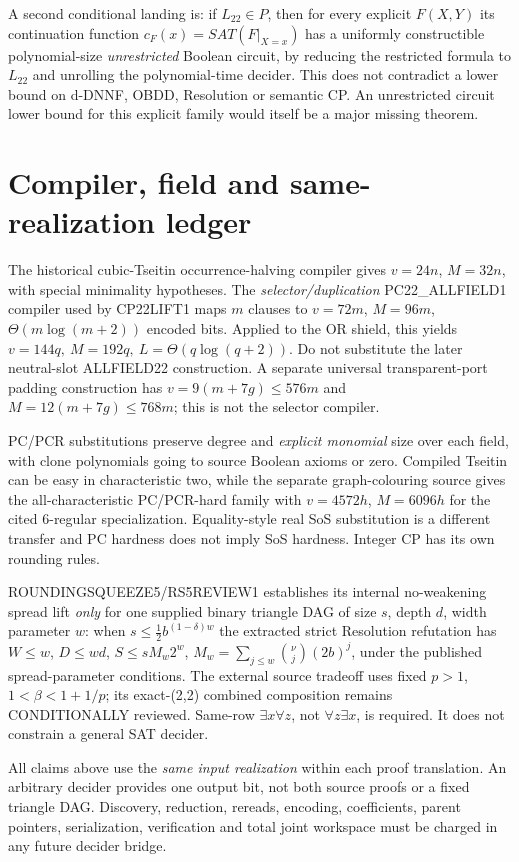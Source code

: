 \documentclass[11pt]{article}
\begin{document}
A second conditional landing is: if $L_{22}\in P$, then for every explicit $F(X,Y)$ its continuation function $c_F(x)=SAT(F|_{X=x})$ has a uniformly constructible polynomial-size \emph{unrestricted} Boolean circuit, by reducing the restricted formula to $L_{22}$ and unrolling the polynomial-time decider. This does not contradict a lower bound on d-DNNF, OBDD, Resolution or semantic CP. An unrestricted circuit lower bound for this explicit family would itself be a major missing theorem.

\section{Compiler, field and same-realization ledger}
\noindent The historical cubic-Tseitin occurrence-halving compiler gives $v=24n$, $M=32n$, with special minimality hypotheses. The \emph{selector/duplication} PC22\_ALLFIELD1 compiler used by CP22LIFT1 maps $m$ clauses to $v=72m$, $M=96m$, $\Theta(m\log(m+2))$ encoded bits. Applied to the OR shield, this yields $\boxed{v=144q,\ M=192q,\ L=\Theta(q\log(q+2))}$. Do not substitute the later neutral-slot ALLFIELD22 construction. A separate universal transparent-port padding construction has $v=9(m+7g)\le576m$ and $M=12(m+7g)\le768m$; this is not the selector compiler.

PC/PCR substitutions preserve degree and \emph{explicit monomial} size over each field, with clone polynomials going to source Boolean axioms or zero. Compiled Tseitin can be easy in characteristic two, while the separate graph-colouring source gives the all-characteristic PC/PCR-hard family with $v=4572h$, $M=6096h$ for the cited 6-regular specialization. Equality-style real SoS substitution is a different transfer and PC hardness does not imply SoS hardness. Integer CP has its own rounding rules.

ROUNDINGSQUEEZE5/RS5REVIEW1 establishes its internal no-weakening spread lift \emph{only} for one supplied binary triangle DAG of size $s$, depth $d$, width parameter $w$: when $s\le\tfrac12 b^{(1-\delta)w}$ the extracted strict Resolution refutation has $W\le w$, $D\le wd$, $S\le s M_w2^w$, $M_w=\sum_{j\le w}{\nu\choose j}(2b)^j$, under the published spread-parameter conditions. The external source tradeoff uses fixed $p>1$, $1<\beta<1+1/p$; its exact-(2,2) combined composition remains CONDITIONALLY reviewed. Same-row $\exists x\forall z$, not $\forall z\exists x$, is required. It does not constrain a general SAT decider.

All claims above use the \emph{same input realization} within each proof translation. An arbitrary decider provides one output bit, not both source proofs or a fixed triangle DAG. Discovery, reduction, rereads, encoding, coefficients, parent pointers, serialization, verification and total joint workspace must be charged in any future decider bridge.
\end{document}

